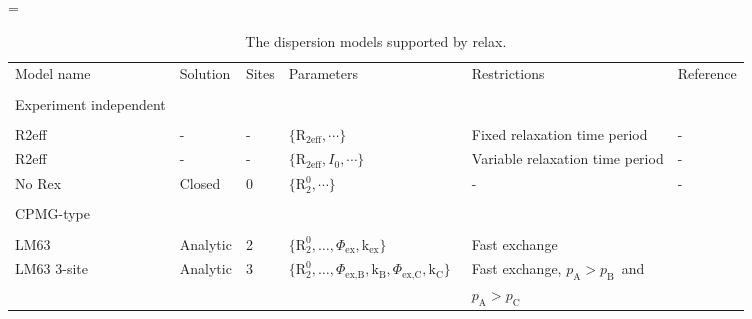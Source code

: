 \documentclass[a4paper,11pt,twoside,openright]{book}
\makeatletter
\let\realnormalsize=\normalsize
\def\liih@math{\ifmmode$\else\bad@math\fi}
\def\adjustnormalsize{\def\normalsize{\mathsurround=0pt \realnormalsize
 \parindent=0pt\abovedisplayskip=0pt\belowdisplayskip=0pt}%
 \def\phantompar{\csname par\endcsname}\normalsize}%
\newcommand\lthtmlvboxmathA{\adjustnormalsize\setbox\sizebox=\vbox\bgroup %
 \let\ifinner=\iffalse \let\)\liih@math }%
\newcommand\lthtmlmathtype[1]{\gdef\lthtmlmathenv{#1}}%
\newcommand\lthtmlfigureA[1]{\let\@savefreelist\@freelist
       \lthtmlmathtype{#1}\lthtmlvboxmathA}%
\makeatother
\begin{document}
\setcounter{footnote}{0}
{\newpage\clearpage
\lthtmlfigureA{landscape8939}%
\begin{landscape}

\begin{center}
\begin{small}
\par
\begin{longtable}{llllll}
\par
\caption[The dispersion models.]{The dispersion models supported by relax.}
\par
\\
\toprule
Model name               & Solution & Sites & Parameters                                          & Restrictions                      & Reference \\
\midrule
\endhead
\par
\bottomrule
\endfoot
\par
\par
\\[-5pt]
Experiment independent \\
\cline{1-1}
\\[-5pt]
R2eff                    & -        & -     & $\{\mathrm{R}_\textrm{2eff}, \cdots\}$\                               & Fixed relaxation time period      & - \\
R2eff                    & -        & -     & $\{\mathrm{R}_\textrm{2eff}, I_0, \cdots\}$\                          & Variable relaxation time period   & - \\
No Rex                   & Closed   & 0     & $\{\mathrm{R}_2^0, \cdots\}$\                              & -                                 & - \\
\par
\\[-5pt]
CPMG-type \\
\cline{1-1}
\\[-5pt]
LM63                     & Analytic & 2     & $\{\mathrm{R}_2^0, \dots, \Phi_\textrm{ex}, \textrm{k}_\textrm{ex}\}$\                 & Fast exchange                     & \citet{LuzMeiboom63} \\
LM63 3-site              & Analytic & 3     & $\{\mathrm{R}_2^0, \dots, \Phi_\textrm{ex,B}, \textrm{k}_\textrm{B}, \Phi_\textrm{ex,C}, \textrm{k}_\textrm{C}\}$\   & Fast exchange, $p_\textrm{A}> p_\textrm{B}$\  and    & \citet{LuzMeiboom63} \\
                         &          &       &                                                     & $p_\textrm{A}> p_\textrm{C}$\  \\

\end{longtable}
\end{small}
\end{center}
\end{landscape}}
\end{document}
